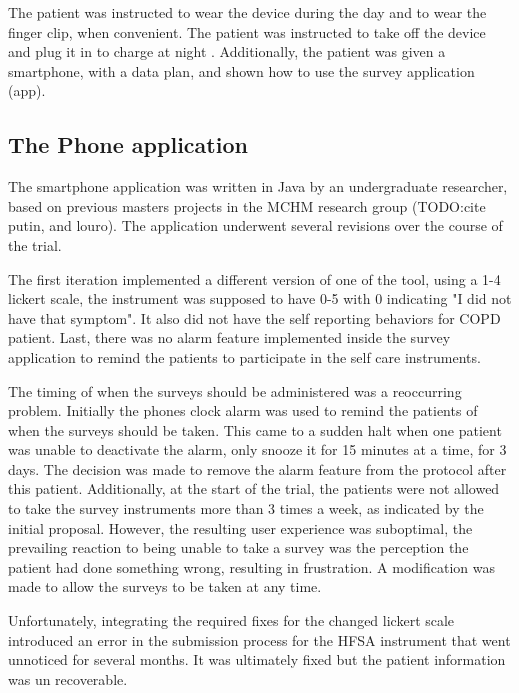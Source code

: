 The patient was instructed to wear the device during the day and to wear the finger clip, when convenient. The patient was instructed to take off the device and plug it in to charge at night . Additionally, the patient was given a smartphone, with a data plan, and shown how to use the survey application (app). 


\subsection{ The Phone application}

The smartphone application was written in Java by an undergraduate researcher, based on previous masters projects in the MCHM research group (TODO:cite putin, and louro). The application underwent several revisions over the course of the trial. 

The first iteration implemented a different version of one of the tool, using a 1-4 lickert scale, the instrument was supposed to have 0-5 with 0 indicating "I did not have that symptom". It also did not have the self reporting behaviors for COPD patient. Last, there was no alarm feature implemented inside the survey application to remind the patients to participate in the self care instruments.

The timing of when the surveys should be administered was a reoccurring problem. Initially the phones clock alarm was used to remind the patients of when the surveys should be taken. This came to a sudden halt when one patient was unable to deactivate the alarm, only snooze it for 15 minutes at a time, for 3 days. The decision was made to remove the alarm feature from the protocol after this patient. Additionally, at the start of the trial, the patients were not allowed to take the survey instruments more than 3 times a week, as indicated by the initial proposal. However, the resulting user experience was suboptimal, the prevailing reaction to being unable to take a survey was the perception the patient had done something wrong, resulting in frustration. A modification was made to allow the surveys to be taken at any time.

Unfortunately, integrating the required fixes for the changed lickert scale introduced an error in the submission process for the HFSA instrument that went unnoticed for several months. It was ultimately fixed but the patient information was un recoverable.
